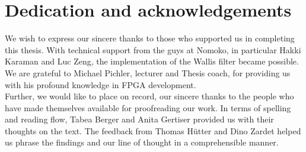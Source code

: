 
\chapter*{Dedication and acknowledgements}
\begin{SingleSpace}





We wish to express our sincere thanks to those who supported us in completing
this thesis. With technical support from the guys at Nomoko, in particular Hakki Karaman
and
Luc Zeng, the implementation of the Wallis filter became possible. We are
grateful to Michael Pichler, lecturer and Thesis coach, for providing us with
his profound knowledge in FPGA development. 
\\

Further, we would like to place on record, our sincere thanks to the people who
have made themselves available for proofreading our work. In terms of spelling
and reading flow, Tabea Berger and Anita Gertiser provided us with their
thoughts on the text. The feedback from Thomas H\"utter and Dino Zardet helped
us phrase the findings and our line of thought in a comprehensible manner.


%
%
%

 \end{SingleSpace} \clearpage